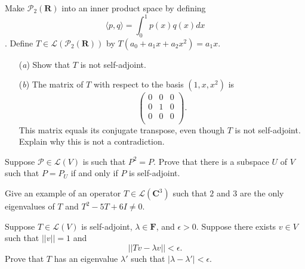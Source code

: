 \documentclass[12pt,letterpaper,boxed]{hmcpset}
\begin{document}

\begin{problem}[6]
Make $\mathcal{P}_2(\textbf{R})$ into an inner product space by defining $$ \langle p,q \rangle = \int_{0}^{1} p(x)q(x) dx $$. Define $ T \in \mathcal{L}(\mathcal{P}_2(\textbf{R})) $ by $ T(a_0 + a_1 x + a_2 x^2) = a_1 x $. 
\begin{itemize}
  \item[(\textit{a})] Show that $T$ is not self-adjoint. 
  
  \item[(\textit{b})] The matrix of $T$ with respect to the basis $(1,x,x^2)$ is 
$$
\begin{pmatrix}
0&0&0\\
0&1&0\\
0&0&0\\
\end{pmatrix}.
$$ This matrix equals its conjugate transpose, even though $T$ is not self-adjoint. Explain why this is not a contradiction. 
\end{itemize}
\end{problem}

\begin{solution}

\end{solution}

\clearpage

\begin{problem}[11]
Suppose $ \mathcal{P} \in \mathcal{L}(V) $ is such that $ P^2 = P $. Prove that there is a subspace $U$ of $V$ such that $P = P_U$ if and only if $P$ is self-adjoint. 
\end{problem}

\begin{solution}
\end{solution}

\clearpage

\begin{problem}[3]
Give an example of an operator $ T \in \mathcal{L}(\textbf{C}^3) $ such that $2$ and $3$ are the only eigenvalues of $T$ and $ T^2 - 5T + 6I \neq 0 $.
\end{problem}

\begin{solution}
\end{solution}

\clearpage


\begin{problem}[12]
Suppose $ T \in \mathcal{L}(V) $ is self-adjoint, $\lambda \in \textbf{F}$, and $\epsilon > 0 $. Suppose there exists $v \in V$ such that $ \vert \vert v \vert \vert = 1 $ and $$ \vert \vert Tv - \lambda v \vert \vert < \epsilon. $$ Prove that $T$ has an eigenvalue $ \lambda'$ such that $ \vert \lambda - \lambda' \vert < \epsilon $.
\end{problem}
\end{document}
